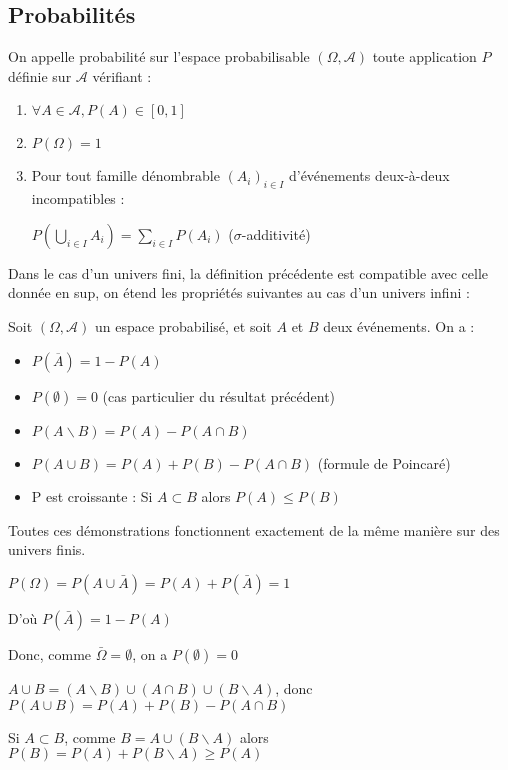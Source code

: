\documentclass[a4paper,12pt]{book}
\newcommand{\Def}[2]{\begin{tcolorbox}[sharp corners, colback=white,colframe=blue!90!black!75, title=Définition : #1]#2\end{tcolorbox}}
\newcommand{\Prop}[2]{\begin{tcolorbox}[sharp corners, colback=white,colframe=red!90!black!75, title=Proposition : #1]#2\end{tcolorbox}}
\newcommand{\Pre}[1]{\begin{tcolorbox}[sharp corners, colback=white,colframe=green!60!green!30!black!75, title=Preuve]#1\end{tcolorbox}}
\begin{document}
\subsection{Probabilités}
\Def{}{On appelle probabilité sur l'espace probabilisable $(\Omega,\mathcal{A})$ toute application $P$ définie sur $\mathcal{A}$ vérifiant :\begin{enumerate}
\item $\forall A\in\mathcal{A}, P(A)\in [0,1]$
\item $P(\Omega)=1$
\item Pour tout famille dénombrable $(A_i)_{i\in I}$ d'événements deux-à-deux incompatibles : \par\begin{center}$P\left(\bigcup_{i\in I}A_i\right)=\sum\limits_{i\in I}P(A_i)$ ($\sigma$-additivité)\end{center}
\end{enumerate}}
Dans le cas d'un univers fini, la définition précédente est compatible avec celle donnée en sup, on étend les propriétés suivantes au cas d'un univers infini :
\Prop{}{Soit $(\Omega,\mathcal{A})$ un espace probabilisé, et soit $A$ et $B$ deux événements. On a :\begin{itemize}
\item $P(\overline{A})=1-P(A)$
\item $P(\emptyset)=0$ (cas particulier du résultat précédent)
\item $P(A\backslash B)=P(A)-P(A\cap B)$
\item $P(A\cup B)=P(A)+P(B)-P(A\cap B)$ (formule de Poincaré)
\item P est croissante : Si $A\subset B$ alors $P(A)\leq P(B)$
\end{itemize}}
\Pre{Toutes ces démonstrations fonctionnent exactement de la même manière sur des univers finis.
\par $P(\Omega)=P(A\cup\bar{A})=P(A)+P(\bar{A})=1$
\par D'où $P(\bar{A})=1-P(A)$
\par Donc, comme $\bar{\Omega}=\emptyset$, on a $P(\emptyset)=0$
\par $A\cup B=(A\backslash B)\cup(A\cap B)\cup (B\backslash A)$, donc $P(A\cup B) = P(A)+P(B)-P(A\cap B)$
\par Si $A\subset B$, comme $B=A\cup(B\backslash A)$ alors $P(B) = P(A)+P(B\backslash A)\geq P(A)$}
\end{document}
